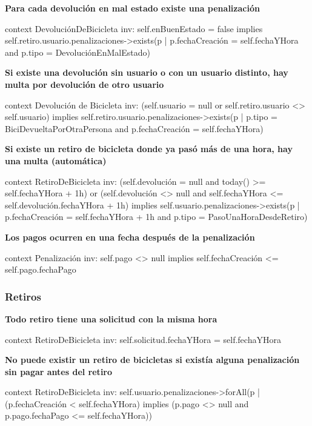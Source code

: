 \documentclass[a4paper, 10pt, twoside]{article}
\newenvironment{ocl}[1]
  {
    \textbf{#1}
    \verbatim
  }{
    \endverbatim
  }
\begin{document}
\begin{ocl}{Para cada devolución en mal estado existe una penalización}
  context DevoluciónDeBicicleta
  inv: self.enBuenEstado = false implies
           self.retiro.usuario.penalizaciones->exists(p |
               p.fechaCreación = self.fechaYHora and
               p.tipo = DevoluciónEnMalEstado)
\end{ocl}

\begin{ocl}{Si existe una devolución sin usuario o con un usuario distinto, hay multa por devolución de otro usuario}
  context Devolución de Bicicleta
  inv: (self.usuario = null or self.retiro.usuario <> self.usuario) implies
           self.retiro.usuario.penalizaciones->exists(p |
               p.tipo = BiciDevueltaPorOtraPersona and p.fechaCreación = self.fechaYHora)
\end{ocl}

\begin{ocl}{Si existe un retiro de bicicleta donde ya pasó más de una hora, hay una multa (automática)}
  context RetiroDeBicicleta
  inv: (self.devolución = null and today() >= self.fechaYHora + 1h) or
       (self.devolución <> null and self.fechaYHora <= self.devolución.fechaYHora + 1h) implies
           self.usuario.penalizaciones->exists(p |
               p.fechaCreación = self.fechaYHora + 1h and
               p.tipo = PasoUnaHoraDesdeRetiro)
\end{ocl}

\begin{ocl}{Los pagos ocurren en una fecha después de la penalización}
  context Penalización
  inv: self.pago <> null implies self.fechaCreación <= self.pago.fechaPago
\end{ocl}


\subsubsection{Retiros}

\begin{ocl}{Todo retiro tiene una solicitud con la misma hora}
  context RetiroDeBicicleta
  inv: self.solicitud.fechaYHora = self.fechaYHora
\end{ocl}

\begin{ocl}{No puede existir un retiro de bicicletas si existía alguna penalización sin pagar antes del retiro}
  context RetiroDeBicicleta
  inv: self.usuario.penalizaciones->forAll(p |
           (p.fechaCreación < self.fechaYHora) implies
               (p.pago <> null and
               p.pago.fechaPago <= self.fechaYHora))
\end{ocl}
\end{document}
